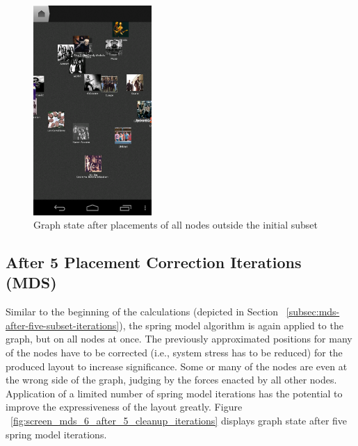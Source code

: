 \begin{figure}[H]
  \centering
    \includegraphics[width=0.4\textwidth]{figures/screen_mds_5_after_all_restnode_additions}
  \caption{Graph state after placements of all nodes outside the initial subset}
  \label{fig:screen_mds_5_after_all_restnode_additions}
\end{figure}

\newpage
\subsection{After 5 Placement Correction Iterations (MDS)}

Similar to the beginning of the calculations (depicted in Section ~\ref{subsec:mds-after-five-subset-iterations}), the spring model algorithm is again applied to the graph, but on all nodes at once. The previously approximated positions for many of the nodes have to be corrected (i.e., system stress has to be reduced) for the produced layout to increase significance. Some or many of the nodes are even at the wrong side of the graph, judging by the forces enacted by all other nodes. Application of a limited number of spring model iterations has the potential to improve the expressiveness of the layout greatly. Figure ~\ref{fig:screen_mds_6_after_5_cleanup_iterations} displays graph state after five spring model iterations.

